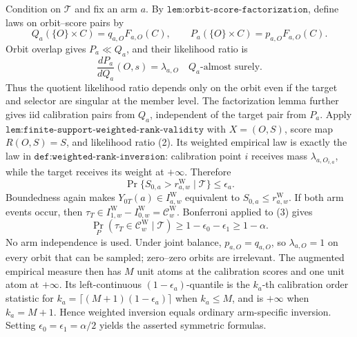 Condition on \(\mathcal T\) and fix an arm \(a\). By \(\texttt{lem:orbit-score-factorization}\), define laws on orbit--score pairs by \[Q_a(\{O\}\times C)=q_{a,O}F_{a,O}(C),\qquad P_a(\{O\}\times C)=p_{a,O}F_{a,O}(C).\tag{1}\] Orbit overlap gives \(P_a\ll Q_a\), and their likelihood ratio is \[\frac{dP_a}{dQ_a}(O,s)=\lambda_{a,O}\quad Q_a\text{-almost surely}.\tag{2}\] Thus the quotient likelihood ratio depends only on the orbit even if the target and selector are singular at the member level. The factorization lemma further gives iid calibration pairs from \(Q_a\), independent of the target pair from \(P_a\). Apply \(\texttt{lem:finite-support-weighted-rank-validity}\) with \(X=(O,S)\), score map \(R(O,S)=S\), and likelihood ratio (2). Its weighted empirical law is exactly the law in \(\texttt{def:weighted-rank-inversion}\): calibration point \(i\) receives mass \(\lambda_{a,O_{i,a}}\), while the target receives its weight at \(+\infty\). Therefore \[\Pr\{S_{0,a}>r^{\mathrm W}_{a,w}\mid\mathcal T\}\le\epsilon_a.\tag{3}\]
Boundedness again makes \(Y_{0T}(a)\in I^{\mathrm W}_{a,w}\) equivalent to \(S_{0,a}\le r^{\mathrm W}_{a,w}\). If both arm events occur, then \(\tau_T\in I^{\mathrm W}_{1,w}-I^{\mathrm W}_{0,w}=\mathcal C^{\mathrm W}_w\). Bonferroni applied to (3) gives \[\Pr_P(\tau_T\in\mathcal C^{\mathrm W}_w\mid\mathcal T)\ge1-\epsilon_0-\epsilon_1\ge1-\alpha.\tag{4}\] No arm independence is used.
Under joint balance, \(p_{a,O}=q_{a,O}\), so \(\lambda_{a,O}=1\) on every orbit that can be sampled; zero--zero orbits are irrelevant. The augmented empirical measure then has \(M\) unit atoms at the calibration scores and one unit atom at \(+\infty\). Its left-continuous \((1-\epsilon_a)\)-quantile is the \(k_a\)-th calibration order statistic for \(k_a=\lceil(M+1)(1-\epsilon_a)\rceil\) when \(k_a\le M\), and is \(+\infty\) when \(k_a=M+1\). Hence weighted inversion equals ordinary arm-specific inversion. Setting \(\epsilon_0=\epsilon_1=\alpha/2\) yields the asserted symmetric formulas.